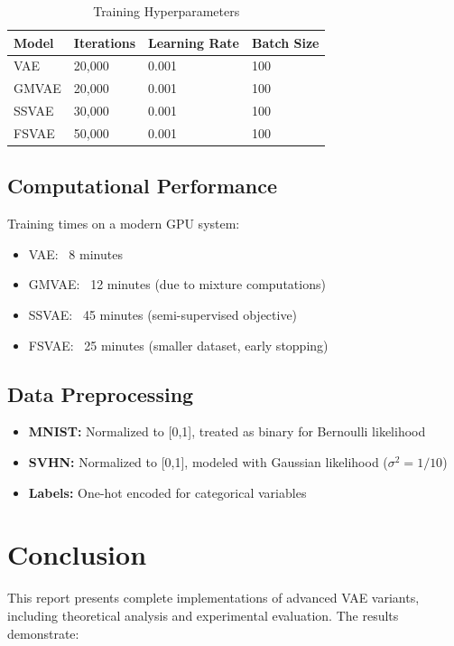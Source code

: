 \documentclass{article}
\begin{document}
\begin{table}[h]
\centering
\caption{Training Hyperparameters}
\label{tab:hyperparams_used}
\begin{tabular}{@{}llll@{}}
\toprule
Model & Iterations & Learning Rate & Batch Size \\
\midrule
VAE & 20,000 & 0.001 & 100 \\
GMVAE & 20,000 & 0.001 & 100 \\
SSVAE & 30,000 & 0.001 & 100 \\
FSVAE & 50,000 & 0.001 & 100 \\
\bottomrule
\end{tabular}
\end{table}

\subsection{Computational Performance}

Training times on a modern GPU system:
\begin{itemize}
\item VAE: ~8 minutes
\item GMVAE: ~12 minutes (due to mixture computations)
\item SSVAE: ~45 minutes (semi-supervised objective)
\item FSVAE: ~25 minutes (smaller dataset, early stopping)
\end{itemize}

\subsection{Data Preprocessing}

\begin{itemize}
\item \textbf{MNIST:} Normalized to [0,1], treated as binary for Bernoulli likelihood
\item \textbf{SVHN:} Normalized to [0,1], modeled with Gaussian likelihood ($\sigma^2 = 1/10$)
\item \textbf{Labels:} One-hot encoded for categorical variables
\end{itemize}

\section{Conclusion}

This report presents complete implementations of advanced VAE variants, including theoretical analysis and experimental evaluation. The results demonstrate:
\end{document}
